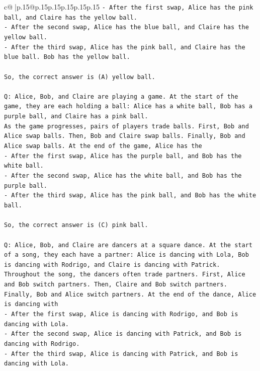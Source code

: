 \documentclass{article}
\begin{document}
{\begin{supertabular}{c@{$\;$}|p{.15\linewidth}@{}p{.15\linewidth}p{.15\linewidth}p{.15\linewidth}p{.15\linewidth}p{.15\linewidth}}
{{{\texttt{{-} After the first swap, Alice has the pink ball, and Claire has the yellow ball.} \\
\texttt{{-} After the second swap, Alice has the blue ball, and Claire has the yellow ball.} \\
\texttt{{-} After the third swap, Alice has the pink ball, and Claire has the blue ball. Bob has the yellow ball.} \\
\\ 
\texttt{So, the correct answer is (A) yellow ball.} \\
\\ 
\texttt{Q: Alice, Bob, and Claire are playing a game. At the start of the game, they are each holding a ball: Alice has a white ball, Bob has a purple ball, and Claire has a pink ball.} \\
\texttt{As the game progresses, pairs of players trade balls. First, Bob and Alice swap balls. Then, Bob and Claire swap balls. Finally, Bob and Alice swap balls. At the end of the game, Alice has the} \\
\texttt{{-} After the first swap, Alice has the purple ball, and Bob has the white ball.} \\
\texttt{{-} After the second swap, Alice has the white ball, and Bob has the purple ball.} \\
\texttt{{-} After the third swap, Alice has the pink ball, and Bob has the white ball.} \\
\\ 
\texttt{So, the correct answer is (C) pink ball.} \\
\\ 
\texttt{Q: Alice, Bob, and Claire are dancers at a square dance. At the start of a song, they each have a partner: Alice is dancing with Lola, Bob is dancing with Rodrigo, and Claire is dancing with Patrick.} \\
\texttt{Throughout the song, the dancers often trade partners. First, Alice and Bob switch partners. Then, Claire and Bob switch partners. Finally, Bob and Alice switch partners. At the end of the dance, Alice is dancing with} \\
\texttt{{-} After the first swap, Alice is dancing with Rodrigo, and Bob is dancing with Lola.} \\
\texttt{{-} After the second swap, Alice is dancing with Patrick, and Bob is dancing with Rodrigo.} \\
\texttt{{-} After the third swap, Alice is dancing with Patrick, and Bob is dancing with Lola.} \\
}}}
\end{supertabular}}
\end{document}
